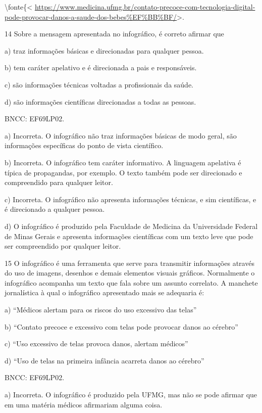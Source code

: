 \textbackslash fonte\{\textless{}
\url{https://www.medicina.ufmg.br/contato-precoce-com-tecnologia-digital-pode-provocar-danos-a-saude-dos-bebes\%EF\%BB\%BF/}\textgreater.

\num{14} Sobre a mensagem apresentada no infográfico, é correto afirmar
que

a) traz informações básicas e direcionadas para qualquer pessoa.

b) tem caráter apelativo e é direcionada a pais e responsáveis.

c) são informações técnicas voltadas a profissionais da saúde.

d) são informações científicas direcionadas a todas as pessoas.

BNCC: EF69LP02.

a) Incorreta. O infográfico não traz informações básicas de modo geral,
são informações específicas do ponto de vista científico.

b) Incorreta. O infográfico tem caráter informativo. A linguagem
apelativa é típica de propagandas, por exemplo. O texto também pode ser
direcionado e compreendido para qualquer leitor.

c) Incorreta. O infográfico não apresenta informações técnicas, e sim
científicas, e é direcionado a qualquer pessoa.

d) O infográfico é produzido pela Faculdade de Medicina da Universidade
Federal de Minas Gerais e apresenta informações científicas com um texto
leve que pode ser compreendido por qualquer leitor.

\num{15} O infográfico é uma ferramenta que serve para transmitir
informações através do uso de imagens, desenhos e demais elementos
visuais gráficos. Normalmente o infográfico acompanha um texto que fala
sobre um assunto correlato. A manchete jornalística à qual o infográfico
apresentado mais se adequaria é:

a) ``Médicos alertam para os riscos do uso excessivo das telas''

b) ``Contato precoce e excessivo com telas pode provocar danos ao
cérebro﻿''

c) ``Uso excessivo de telas provoca danos, alertam médicos''

d) ``Uso de telas na primeira infância acarreta danos ao cérebro''

BNCC: EF69LP02.

a) Incorreta. O infográfico é produzido pela UFMG, mas não se pode
afirmar que em uma matéria médicos afirmariam alguma coisa.

